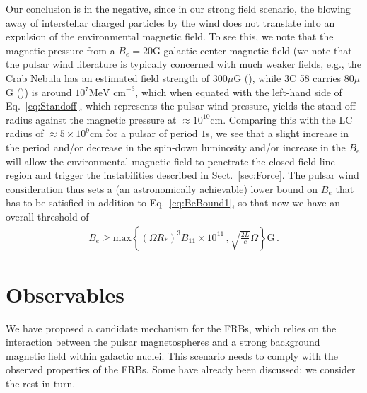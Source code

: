 \documentclass{aa}
\newcommand{\bea}{\begin{eqnarray}}
\newcommand{\eea}{\end{eqnarray}}
\begin{document}
Our conclusion is in the negative, since in our strong field scenario, the blowing away of interstellar charged particles by the wind does not translate into an expulsion of the environmental magnetic field. To see this, we note that the magnetic pressure from a $B_e=20$G galactic center magnetic field (we note that the pulsar wind literature is typically concerned with much weaker fields, e.g., the Crab Nebula has an estimated field strength of $300\mu$G (\cite{1982RvMP...54.1183T}), while 3C 58 carries $80\mu$G (\cite{1992MNRAS.258..833G})) is around $10^7 \text{MeV cm}^{-3}$, which when equated with the left-hand side of Eq.~\eqref{eq:Standoff}, which represents the pulsar wind pressure, yields the stand-off radius against the magnetic pressure at $\approx 10^{10}$cm. Comparing this with the LC radius of $\approx 5\times 10^9$cm for a pulsar of period $1$s, we see that a slight increase in the period and/or decrease in the spin-down luminosity and/or increase in the $B_e$ will allow the environmental magnetic field to penetrate the closed field line region and trigger the instabilities described in Sect.~\ref{sec:Force}. The pulsar wind consideration thus sets a (an astronomically achievable) lower bound on $B_e$ that has to be satisfied in addition to Eq.~\eqref{eq:BeBound1}, so that now we have an overall threshold of
\bea \label{eq:BeBound}
B_e \geq \text{max}\left\{(\Omega R_*)^3 B_{11}\times 10^{11} \,, \sqrt{\frac{2 L}{c}}\Omega\right\} \text{G}\,.
\eea

  
\section{Observables} \label{sec:Dis}
We have proposed a candidate mechanism for the FRBs, which relies on the interaction between the pulsar magnetospheres and a strong background magnetic field within galactic nuclei. This scenario needs to comply with the observed properties of the FRBs. Some have already been discussed; we consider the rest in turn.
  
\end{document}
